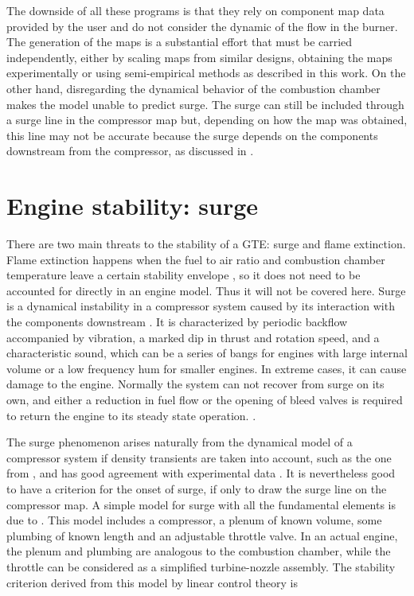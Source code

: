 The downside of all these programs is that they rely on component map data provided by the user 
and do not consider the dynamic of the flow in the burner.
The generation of the maps is a substantial effort that must be carried independently, 
either by scaling maps from similar designs, obtaining the maps experimentally 
or using semi-empirical methods as described in this work. 
On the other hand, disregarding the dynamical behavior of the combustion chamber makes the model unable to predict surge. The surge can still be included through a surge line in the compressor map but,
depending on how the map was obtained, this line may not be accurate because the surge depends on the components downstream from the compressor, as discussed in .

\section{Engine stability: surge}
\label{sec:review:surge}

There are two main threats to the stability of a \ac{GTE}: surge and flame extinction.
Flame extinction happens when the fuel to air ratio and combustion chamber temperature 
leave a certain stability envelope \cite{Mattingly1996}, 
so it does not need to be accounted for directly in an engine model.
Thus it will not be covered here.
Surge is a dynamical instability in a compressor system caused by its interaction with the components downstream \cite{Sparks1983}. 
It is characterized by periodic backflow accompanied by vibration, a marked dip in thrust and rotation speed, and a characteristic sound, 
which can be a series of bangs for engines with large internal volume or a low frequency hum for smaller engines.
In extreme cases, it can cause damage to the engine. 
Normally the system can not recover from surge on its own, 
and either a reduction in fuel flow or the opening of bleed valves is required to return the engine to its steady state operation.
\cite{Willems1999}.

The surge phenomenon arises naturally from the dynamical model of a compressor system if density transients are taken into account, such as the one from  \cite{Greitzer1976}, 
and has good agreement with experimental data \cite{Greitzer1976_2,Gravdahl2004}.
It is nevertheless good to have a criterion for the onset of surge, if only to draw the surge line on the compressor map.
A simple model for surge with all the fundamental elements is due to \textcite{Fink1988}. This model includes a compressor, a plenum of known volume, some plumbing of known length and an adjustable throttle valve. 
In an actual engine, the plenum and plumbing are analogous to the combustion chamber, while the throttle can be considered as a simplified turbine-nozzle assembly. 
The stability criterion derived from this model by linear control theory is

